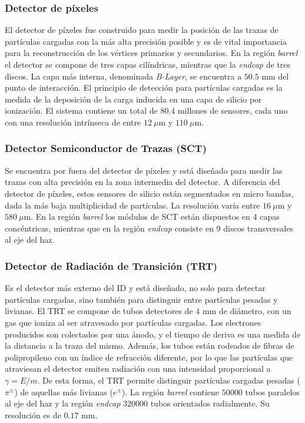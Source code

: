 \subsubsection{Detector de píxeles}

El detector de píxeles fue construido para medir la posición de las trazas de partículas cargadas con la más alta precisión posible y es de vital importancia para la reconstrucción de los vértices primarios y secundarios. En la región \textit{barrel} el detector se compone de tres capas cilíndricas, mientras que la \textit{endcap} de tres discos. La capa más interna, denominada \textit{B-Layer}, se encuentra a $50.5$ mm del punto de interacción. El principio de detección para partículas cargadas es la medida de la deposición de la carga inducida en una capa de silicio por ionización. El sistema contiene un total de $80.4$ millones de sensores, cada uno con una resolución intrínseca de entre $12 \:\mu$m y $110\:\mu$m.

\subsubsection{Detector Semiconductor de Trazas (SCT)}

Se encuentra por fuera del detector de píxeles y está diseñado para medir las trazas con alta precisión en la zona intermedia del detector. A diferencia del detector de píxeles, estos sensores de silicio están segmentados en micro bandas, dada la más baja multiplicidad de partículas. La resolución varía entre $16 \:\mu$m y $580 \:\mu$m. En la región \textit{barrel} los módulos de SCT están dispuestos en 4 capas concéntricas, mientras que en la región \textit{endcap} consiste en 9 discos transversales al eje del haz.

\subsubsection{Detector de Radiación de Transición (TRT)}

Es el detector más externo del ID y está diseñado, no solo para detectar partículas cargadas, sino también para distinguir entre partículas pesadas y livianas. El TRT se compone de tubos detectores de $4$ mm de diámetro, con un gas que ioniza al ser atravesado por partículas cargadas. Los electrones producidos son colectados por una ánodo, y el tiempo de deriva es una medida de la distancia a la traza del mismo.  Además, los tubos están rodeados de fibras de polipropileno con un índice de refracción diferente, por lo que las partículas que atraviesan el detector emiten radiación con una intensidad proporcional a $\gamma=E/m$. De esta forma, el TRT permite distinguir partículas cargadas pesadas ($\pi^{\pm}$) de aquellas más livianas ($e^{\pm}$). La región \textit{barrel} contiene $50000$ tubos paralelos al eje del haz y la región \textit{endcap} $320000$ tubos orientados radialmente. Su resolución es de $0.17$ mm.

